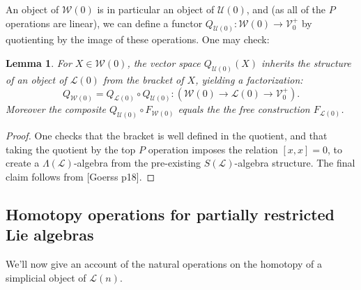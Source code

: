 \documentclass[11pt]{amsart}
\theoremstyle{plain}
\newtheorem{lem}[thm]{Lemma}
\theoremstyle{definition}
\renewcommand{\to}{\longrightarrow}
\newcommand{\scrL}{\mathscr{L}}
\newcommand{\calW}{\mathcal{W}}
\newcommand{\calU}{\mathcal{U}}
\newcommand{\calL}{\mathcal{L}}
\newcommand{\calV}{\mathcal{V}}
\theoremstyle{plain}
\newcommand{\LieOperad}{{\scrL}}
\newcommand{\vect}[2]{\calV^{#1}_{#2}}
\begin{document}
\begin{Lie algebras in characteristic 2 and their homotopy operations}
An object of $\calW(0)$ is in particular an object of $\calU(0)$, and (as all of the $P$ operations are linear), we can define a functor $Q_{\calU(0)}:\calW(0)\to\vect{+}{0}$ by quotienting by the image of these operations. One may check:
\begin{lem}\label{Kill P ops gives lie alg}
For $X\in\calW(0)$, the vector space $Q_{\calU(0)}(X)$ inherits the structure of an object of $\calL(0)$ from the bracket of $X$, yielding a factorization:%
\[Q_{\calW(0)}=Q_{\calL(0)}\circ Q_{\calU(0)}:\left(\calW(0)\to \calL(0)\to \vect{+}{0}\right).\]
Moreover the composite $Q_{\calU(0)}\circ F_{\calW(0)}$ equals the the free construction $F_{\calL(0)}$.
\end{lem}
\begin{proof}
One checks that the bracket is well defined in the quotient, and that taking the quotient by the top $P$ operation imposes the relation $[x,x]=0$, to create a $\Lambda(\LieOperad)$-algebra from the pre-existing $S(\LieOperad)$-algebra structure. The final claim follows from [Goerss p18].
\end{proof}


\subsection{Homotopy operations for partially restricted Lie algebras}
We'll now give an account of the natural operations on the homotopy of a simplicial object of $\calL(n)$.


\end{Lie algebras in characteristic 2 and their homotopy operations}
\end{document}

